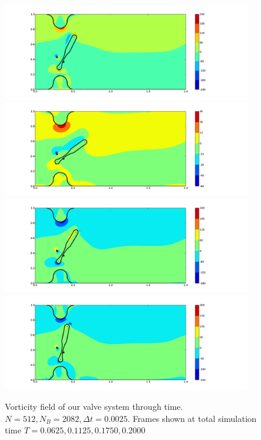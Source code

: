 \documentclass[preprint,12pt]{elsarticle}
\begin{document}
\begin{figure}[p]
\begin{center}
\includegraphics[bb=1.3in .5in 13.5in 6in,width=4.2in,clip]{fig_c25_n512.pdf}
\hfill
\includegraphics[bb=1.3in .5in 13.5in 6in,width=4.2in,clip]{fig_c45_n512.pdf}
\hfill
\includegraphics[bb=1.3in .5in 13.5in 6.3in,width=4.2in,clip]{fig_c70_n512.pdf}
\hfill
\includegraphics[bb=1.3in .5in 13.5in 6.5in,width=4.2in,clip]{fig_c80_n512.pdf}
\end{center}
\caption{\small Vorticity field of our valve system through time. $N=512,N_B=2082,\Delta t=0.0025$. Frames shown at total simulation time $T=0.0625,0.1125,0.1750,0.2000$}
\label{fig:TimeProgression}
\end{figure}
\end{document}
